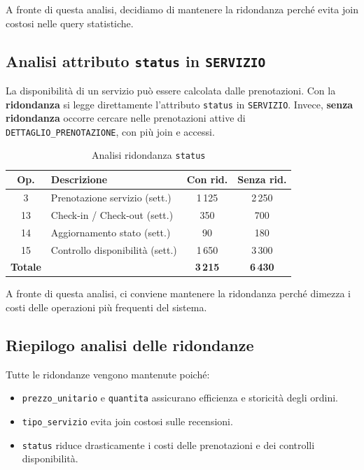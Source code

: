 \documentclass[a4paper,12pt]{report}
\begin{document}
\noindent
A fronte di questa analisi, decidiamo di mantenere la ridondanza perché evita join costosi nelle query statistiche.

\subsection{Analisi attributo \texttt{status} in \texttt{SERVIZIO}}
La disponibilità di un servizio può essere calcolata dalle prenotazioni.
Con la \textbf{ridondanza} si legge direttamente l’attributo \texttt{status} in \texttt{SERVIZIO}.
Invece, \textbf{senza ridondanza} occorre cercare nelle prenotazioni attive di \texttt{DETTAGLIO\_PRENOTAZIONE}, con più join e accessi.

\begin{table}[H]
	\centering
	\small
	\begin{tabular}{|c|l|c|c|}
		\hline
		\rowcolor{gray!20}
		\textbf{Op.}    & \textbf{Descrizione}            & \textbf{Con rid.} & \textbf{Senza rid.} \\
		\hline
		3               & Prenotazione servizio (sett.)   & 1\,125            & 2\,250              \\
		13              & Check-in / Check-out (sett.)    & 350               & 700                 \\
		14              & Aggiornamento stato (sett.)     & 90                & 180                 \\
		15              & Controllo disponibilità (sett.) & 1\,650            & 3\,300              \\
		\hline
		\textbf{Totale} &                                 & \textbf{3\,215}   & \textbf{6\,430}     \\
		\hline
	\end{tabular}
	\caption{Analisi ridondanza \texttt{status}}
\end{table}

\noindent
A fronte di questa analisi, ci conviene mantenere la ridondanza perché dimezza i costi delle operazioni più frequenti del sistema.

\subsection*{Riepilogo analisi delle ridondanze}
Tutte le ridondanze vengono mantenute poiché:
\begin{itemize}
	\item \texttt{prezzo\_unitario} e \texttt{quantita} assicurano efficienza e storicità degli ordini.
	\item \texttt{tipo\_servizio} evita join costosi sulle recensioni.
	\item \texttt{status} riduce drasticamente i costi delle prenotazioni e dei controlli disponibilità.
\end{itemize}
\end{document}
